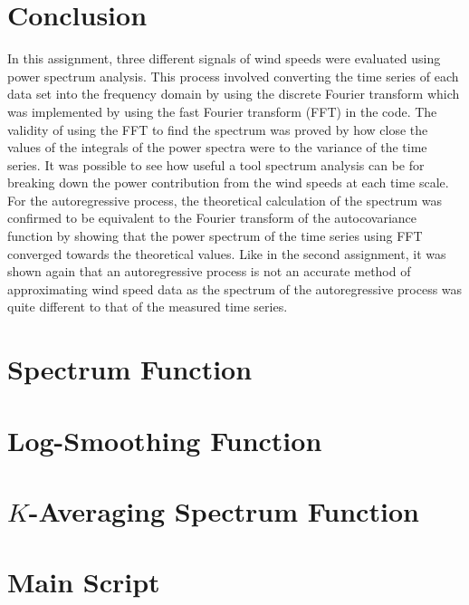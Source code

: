 \documentclass[11pt]{article}
\begin{document}
\section{Conclusion}
In this assignment, three different signals of wind speeds were evaluated using power spectrum analysis. This process involved converting the time series of each data set into the frequency domain by using the discrete Fourier transform which was implemented by using the fast Fourier transform (FFT) in the code. The validity of using the FFT to find the spectrum was proved by how close the values of the integrals of the power spectra were to the variance of the time series. It was possible to see how useful a tool spectrum analysis can be for breaking down the power contribution from the wind speeds at each time scale. For the autoregressive process, the theoretical calculation of the spectrum was confirmed to be equivalent to the Fourier transform of the autocovariance function by showing that the power spectrum of the time series using FFT converged towards the theoretical values. Like in the second assignment, it was shown again that an autoregressive process is not an accurate method of approximating wind speed data as the spectrum of the autoregressive process was quite different to that of the measured time series.
\pagebreak
\begin{appendices}
\section{Spectrum Function}


\section{Log-Smoothing Function}


\section{$K$-Averaging Spectrum Function}


\section{Main Script}

%
%



\end{appendices}
\end{document}
